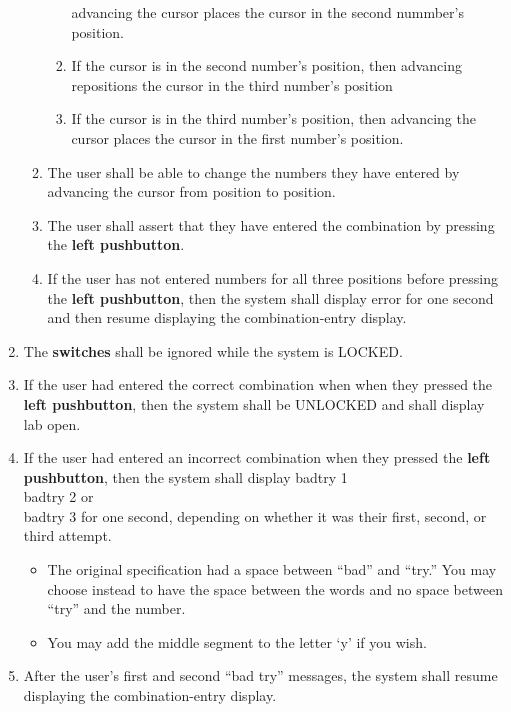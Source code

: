 \begin{enumerate}
\begin{enumerate}
\begin{enumerate}
            advancing the cursor places the cursor in the second nummber's
            position.
        \item If the cursor is in the second number's position, then
            advancing repositions the cursor in the third number's position
        \item If the cursor is in the third number's position, then
            advancing the cursor places the cursor in the first number's
            position.
        \end{enumerate}
    \item The user shall be able to change the numbers they have entered by
        advancing the cursor from position to position.
    \item The user shall assert that they have entered the combination by
        pressing the \textbf{left pushbutton}.
    \item If the user has not entered numbers for all three positions before
        pressing the \textbf{left pushbutton}, then the system shall display
        {\dviiseg error} for one second and then resume displaying
        the combination-entry display.
    \end{enumerate}
\item The \textbf{switches} shall be ignored while the system is LOCKED.
\item If the user had entered the correct combination when when they pressed
    the \textbf{left pushbutton}, then the system shall be UNLOCKED and shall
    display {\dviiseg lab open}.
\item If the user had entered an incorrect combination when they pressed the
    \textbf{left pushbutton}, then the system shall display
    {\dviiseg badtry 1} \\ {\dviiseg badtry 2} or \\ {\dviiseg badtry 3} for
    one second, depending on whether it was their first, second, or third
    attempt.
    \begin{itemize}
    \item The original specification had a space between ``bad'' and ``try.''
        You may choose instead to have the space between the words and no space
        between ``try'' and the number.
    \item You may add the middle segment to the letter `y' if you wish.
    \end{itemize}
\item After the user's first and second ``bad try'' messages, the system shall
    resume displaying the combination-entry display.

\end{enumerate}
